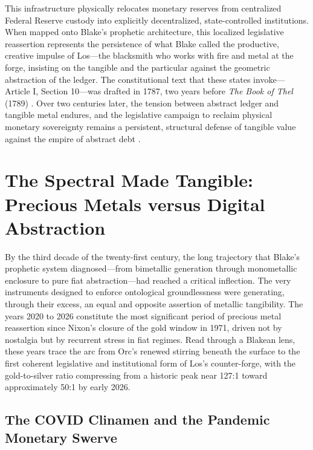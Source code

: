 \documentclass[
]{article}
\begin{document}
This infrastructure physically relocates monetary reserves from
centralized Federal Reserve custody into explicitly decentralized,
state-controlled institutions. When mapped onto Blake's prophetic
architecture, this localized legislative reassertion represents the
persistence of what Blake called the productive, creative impulse of
Los---the blacksmith who works with fire and metal at the forge,
insisting on the tangible and the particular against the geometric
abstraction of the ledger. The constitutional text that these states
invoke---Article I, Section 10---was drafted in 1787, two years before
\emph{The Book of Thel} (1789) \citep{blake1789thel}. Over two centuries
later, the tension between abstract ledger and tangible metal endures,
and the legislative campaign to reclaim physical monetary sovereignty
remains a persistent, structural defense of tangible value against the
empire of abstract debt \citep{erdman1988complete}.

\newpage

\section{The Spectral Made Tangible: Precious Metals versus Digital
Abstraction}\label{sec-spectral-2020-2026}

By the third decade of the twenty-first century, the long trajectory
that Blake's prophetic system diagnosed---from bimetallic generation
through monometallic enclosure to pure fiat abstraction---had reached a
critical inflection. The very instruments designed to enforce
ontological groundlessness were generating, through their excess, an
equal and opposite assertion of metallic tangibility. The years 2020 to
2026 constitute the most significant period of precious metal
reassertion since Nixon's closure of the gold window in 1971, driven not
by nostalgia but by recurrent stress in fiat regimes. Read through a
Blakean lens, these years trace the arc from Orc's renewed stirring
beneath the surface to the first coherent legislative and institutional
form of Los's counter-forge, with the gold-to-silver ratio compressing
from a historic peak near 127:1 toward approximately 50:1 by early 2026.

\subsection{The COVID Clinamen and the Pandemic Monetary
Swerve}\label{the-covid-clinamen-and-the-pandemic-monetary-swerve}
\end{document}
